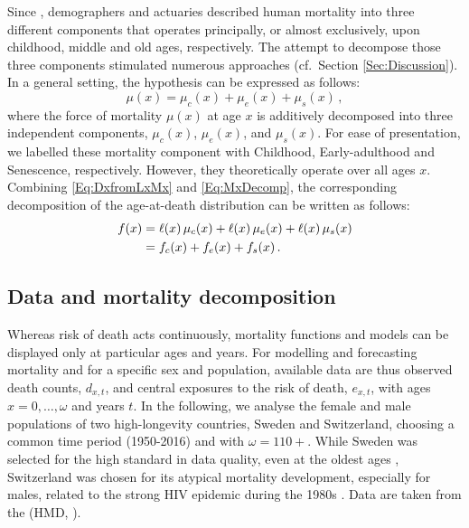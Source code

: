 \documentclass[11pt, a4paper]{article}
\begin{document}
Since \cite{thiele1871mathematical}, demographers and actuaries described human mortality into three different components that operates principally, or almost exclusively, upon childhood, middle and old ages, respectively. The attempt to decompose those three components stimulated numerous approaches (cf.~Section \ref{Sec:Discussion}). In a general setting, the hypothesis can be expressed as follows:
%
\begin{equation}\label{Eq:MxDecomp}
	\mu(x)=\mu_{c}(x)+\mu_{e}(x)+\mu_{s}(x)  \, ,
\end{equation}
%
where the force of mortality $\mu(x)$ at age $x$ is additively decomposed into three independent components, $\mu_{c}(x)$, $\mu_{e}(x)$, and $\mu_s(x)$. For ease of presentation, we labelled these mortality component with Childhood, Early-adulthood and Senescence, respectively. However, they theoretically operate over all ages $x$. Combining \eqref{Eq:DxfromLxMx} and \eqref{Eq:MxDecomp}, the corresponding decomposition of the age-at-death distribution can be written as follows: 
%
\begin{align}\label{Eq:FxDecom}
f(x) & = \ell(x)\,\mu_{c}(x) + \ell(x)\,\mu_{e}(x) + \ell(x)\,\mu_{s}(x) \notag \\
& = f_{c}(x)+f_{e}(x)+f_{s}(x) \, . 
\end{align}
%

\subsection{Data and mortality decomposition}\label{Subsec:DataMortDecomp}
Whereas risk of death acts continuously, mortality functions and models can be displayed only at particular ages and years. For modelling and forecasting mortality and for a specific sex and population, available data are thus observed death counts, $d_{x,t}$, and central exposures to the risk of death, $e_{x,t}$, with ages $x=0,\dots,\omega$ and years $t$. In the following, we analyse the female and male populations of two high-longevity countries, Sweden and Switzerland, choosing a common time period (1950-2016) and with $\omega=110+$. While Sweden was selected for the high standard in data quality, even at the oldest ages \citep{vaupel1994longer,wilmoth1996extreme}, Switzerland was chosen for its atypical mortality development, especially for males, related to the strong HIV epidemic during the 1980s \citep{csete2012switzerland}. Data are taken from the \citeauthor{HMD} (HMD, \citeyear{HMD}). 
\end{document}
